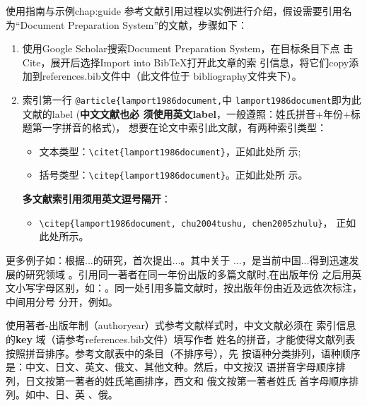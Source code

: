 \begin{cuzchapter}{使用指南与示例}{chap:guide}
    参考文献引用过程以实例进行介绍，假设需要引用名为``Document Preparation
    System''的文献，步骤如下：
    \begin{enumerate}
        \item 使用Google Scholar搜索Document Preparation System，在目标条目下点
              击Cite，展开后选择Import into BibTeX打开此文章的索
              引信息，将它们copy添加到references.bib文件中（此文件位于
              bibliography文件夹下）。
        \item 索引第一行 \verb|@article{lamport1986document,|中
              \verb|lamport1986document|即为此文献的label (\textbf{中文文献也必
                  须使用英文label}，一般遵照：姓氏拼音+年份+标题第一字拼音的格式)，
              想要在论文中索引此文献，有两种索引类型：
              \begin{itemize}
                  \item 文本类型：\verb|\citet{lamport1986document}|，正如此处所
                        示\citet{lamport1986document};
                  \item 括号类型：\verb|\citep{lamport1986document}|。正如此处所
                        示\citep{lamport1986document}。
              \end{itemize}
              \textbf{多文献索引用须用英文逗号隔开}：
              \begin{itemize}
                  \item \verb|\citep{lamport1986document, chu2004tushu, chen2005zhulu}|，
                        正如此处所示\citep{lamport1986document, chu2004tushu, chen2005zhulu}。
              \end{itemize}
    \end{enumerate}

    更多例子如：\citet{walls2013drought}根据...的研究，首次提出...。其中关于
    ...\citep{walls2013drought}，是当前中国...得到迅速发展的研究领域
    \citep{chen1980zhongguo}。引用同一著者在同一年份出版的多篇文献时,在出版年份
    之后用英文小写字母区别，如：\citep{yuan2012lana, yuan2012lanb,
        yuan2012lanc}。同一处引用多篇文献时，按出版年份由近及远依次标注，中间用分号
    分开，例如\citep{chen1980zhongguo, stamerjohanns2009mathml, hls2012jinji,
        niu2013zonghe}。

    使用著者-出版年制（authoryear）式参考文献样式时，中文文献必须在
    索引信息的\textbf{key} 域（请参考references.bib文件）填写作者
    姓名的拼音，才能使得文献列表按照拼音排序。参考文献表中的条目（不排序号），先
    按语种分类排列，语种顺序是：中文、日文、英文、俄文、其他文种。然后，中文按汉
    语拼音字母顺序排列，日文按第一著者的姓氏笔画排序，西文和 俄文按第一著者姓氏
    首字母顺序排列。如中\citep{niu2013zonghe}、日\citep{Bohan1928}、英
    \citep{stamerjohanns2009mathml}、俄\citep{Dubrovin1906}。


\end{cuzchapter}
